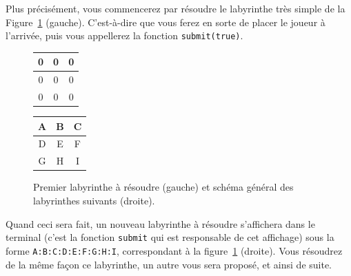 \documentclass[a4paper]{article}
\begin{document}
Plus précisément, vous commencerez par résoudre le labyrinthe très simple de la Figure~\ref{fig:conteststart} (gauche). C'est-à-dire que vous ferez en sorte de placer le joueur à l'arrivée, puis vous appellerez la fonction \verb|submit(true)|.

\begin{figure}[htbp]
  \centering
\begin{tabular}{|c|c|c|}
  \hline
  0 & 0 & 0 \\
  \hline
  0 & 0 & 0 \\
  \hline
  0 & 0 & 0 \\
  \hline
\end{tabular}
\hspace{2.5cm}
\begin{tabular}{|c|c|c|}
  \hline
  A & B & C \\
  \hline
  D & E & F \\
  \hline
  G & H & I \\
  \hline
\end{tabular}
\caption{Premier labyrinthe à résoudre (gauche) et schéma général des labyrinthes suivants (droite).}\label{fig:conteststart}
\end{figure}

Quand ceci sera fait, un nouveau labyrinthe à résoudre s'affichera dans le terminal (c'est la fonction \verb|submit| qui est responsable de cet affichage) sous la forme \verb|A:B:C:D:E:F:G:H:I|, correspondant à la figure~\ref{fig:conteststart} (droite).
Vous résoudrez de la même façon ce labyrinthe, un autre vous sera proposé, et ainsi de suite.
\end{document}
